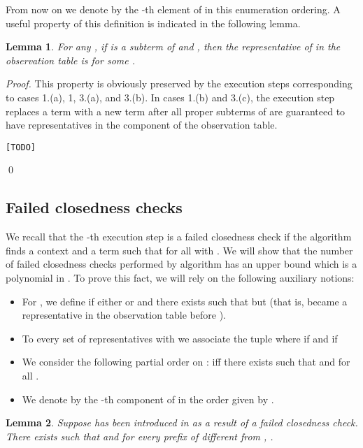 \documentclass[preprint,12pt,english]{article}
\newcommand\comment[1]{}
\def\todo{\begin{center}{\color{red}\tt [TODO]}\end{center}}
\newtheorem{lemma}{Lemma}
\begin{document}
{\begin{enumerate}
\begin{enumerate}
 \end{enumerate}
\end{enumerate}
From now on we denote by  the -th element of  in this enumeration ordering. 
A useful property of this definition is indicated in the following lemma.
\begin{lemma}
For any  , if  is a subterm of  and , then the representative of  in the observation table  is  for some .
\end{lemma}
\begin{proof}
This property is obviously preserved by the execution steps  corresponding to cases 1.(a), 1, 3.(a), and 3.(b). In cases 1.(b) and 3.(c), the execution step replaces a term  with a new term  after all proper subterms of  are guaranteed to have representatives in the  component of the observation table.
\todo
\qed
\end{proof}
}
\subsection{Failed closedness checks}
We recall that the -th execution step is a failed closedness check  if the algorithm finds a context  and a term  such that  for all  with . 
We will show that the number of failed closedness checks performed by  algorithm  has an upper bound which is a polynomial in . To prove this fact, we will rely on the following auxiliary notions:
\begin{itemize}
\item For , we define  if either  or  and there exists  such that  but  (that is,  became a representative in the observation table before ).
\item To every set of representatives  with 
we associate the tuple  where  
 if  and  if 
\item We consider the following  partial order on :  iff there exists  such that  and  for all .
\item We denote by  the -th component of   in the order given by . 
\end{itemize}
\comment{
\begin{lemma}
\label{lmng}
Let  such that 
 and  Then
 Then .
\end{lemma}
\begin{proof}
Obvious.\qed
\end{proof}
\comment
It is easy to see that the following inequalities hold for all execution steps : 

}

\begin{lemma}
\label{lema8}
Suppose  has been introduced in  as a result of a failed closedness check. There exists   such that  and for every prefix  of  different from , .
\end{lemma}
\end{document}
